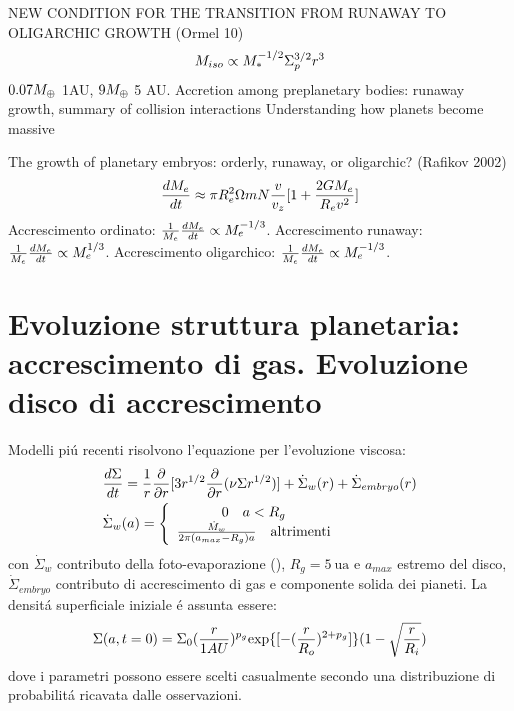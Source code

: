 \begin{workout}
 NEW CONDITION FOR THE TRANSITION FROM RUNAWAY TO OLIGARCHIC GROWTH (Ormel 10)
 \begin{equation}
M_{iso}\propto M_*\expy{-1/2}\Sigma_p\expy{3/2}r^3
\end{equation}
$0.07\mearth{}$ 1AU, $9\mearth{}$ 5 AU.
Accretion among preplanetary bodies: runaway growth, summary of collision interactions
Understanding how planets become massive
\end{workout}
  
\begin{workout}
The growth of planetary embryos:  orderly, runaway, or oligarchic? (Rafikov 2002)
\begin{align}
\TDy{t}{M_e}\approx\pi R_e^2\Omega mN\frac{v}{v_z}[1+\frac{2GM_e}{R_ev^2}]
\end{align}
Accrescimento ordinato: $\frac{1}{M_e}\TDy{t}{M_e}\propto M_e\expy{-1/3}$. Accrescimento runaway: $\frac{1}{M_e}\TDy{t}{M_e}\propto M_e\expy{1/3}$. Accrescimento oligarchico: $\frac{1}{M_e}\TDy{t}{M_e}\propto M_e\expy{-1/3}$.
\end{workout}

\begin{workout}

\end{workout}


{\let\clearpage\relax\let\cleardoublepage\relax
\chapter{Evoluzione struttura planetaria: accrescimento di gas. Evoluzione disco di accrescimento}\label{chap:gasaccretion}
}%

Modelli pi\'u recenti  risolvono l'equazione per l'evoluzione viscosa:
\begin{align}
	&\TDy{t}{\Sigma}=\frac{1}{r}\PDof{r}[3r\expy{1/2}\PDof{r}(\nu\Sigma r\expy{1/2})]+\dot{\Sigma}_w(r)+\dot{\Sigma}_{embryo}(r)\label{eq:diskaccrphev-m18}\\
	&\dot{\Sigma}_w(a)=\left\{\begin{array}{c}0\quad a<R_g\\\frac{\dot{M}_w}{2\pi(a_{max}-R_g)a}\quad \text{altrimenti}\\\end{array}\right.
\end{align}
con $\dot{\Sigma}_w$ contributo della foto-evaporazione (\cite{veras2004outward}), $R_g=\SI{5}{\astronomicalunit}$ e $a_{max}$ estremo del disco,  $\dot{\Sigma}_{embryo}$ contributo di accrescimento di gas e componente solida dei pianeti.
La densit\'a superficiale iniziale \'e assunta essere:
\begin{equation}
\Sigma(a,t=0)=\Sigma_0(\frac{r}{1AU})\expy{p_g}\Exp{[-(\frac{r}{R_o})\expy{2+p_g}]}(1-\sqrt{\frac{r}{R_i}})
\end{equation}
dove i parametri possono essere scelti casualmente secondo una distribuzione di probabilit\'a ricavata dalle osservazioni.


